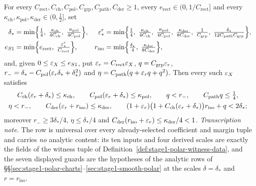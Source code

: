 \begin{lemma}\label{lem:stage1-polar-scalar-arithmetic}
For every $C_{\mathrm{rect}},C_{\mathrm{ch}},C_{\mathrm{pol}},C_{\mathrm{grp}},
C_{\mathrm{path}},C_{\mathrm{der}}\ge1$, every
$e_{\mathrm{rect}}\in(0,1/C_{\mathrm{rect}}]$ and every
$\kappa_{\mathrm{ch}},\kappa_{\mathrm{pol}},\kappa_{\mathrm{der}}\in(0,\tfrac12]$, set
\begin{align}
  \delta_*&=\min\Bigl\{\tfrac14,\;\tfrac{\kappa_{\mathrm{ch}}}{4C_{\mathrm{ch}}},\;
    \tfrac{\kappa_{\mathrm{pol}}}{4C_{\mathrm{pol}}}\Bigr\},
  &
  \varepsilon_*^{r}&=\min\Bigl\{\tfrac14,\;\tfrac{\kappa_{\mathrm{ch}}}{4C_{\mathrm{ch}}},\;
    \tfrac{\kappa_{\mathrm{pol}}}{4C_{\mathrm{pol}}},\;
    \tfrac{\kappa_{\mathrm{der}}}{8C_{\mathrm{der}}},\;
    \tfrac1{C_{\mathrm{grp}}},\;
    \tfrac{\delta_*}{12C_{\mathrm{path}}C_{\mathrm{grp}}}\Bigr\},
  \label{eq:s1sa-scales}\\
  e_{S1}&=\min\Bigl\{e_{\mathrm{rect}},\;\tfrac{\varepsilon_*^{r}}{C_{\mathrm{rect}}}\Bigr\},
  &
  r_{\mathrm{iso}}&=\min\Bigl\{\tfrac{\delta_*}4,\;\tfrac{\kappa_{\mathrm{der}}}{8C_{\mathrm{der}}}\Bigr\},
  \nonumber
\end{align}
and, given $0\le\varepsilon_X\le e_{S1}$, put $\varepsilon_r=C_{\mathrm{rect}}\varepsilon_X$,
$q=C_{\mathrm{grp}}\varepsilon_r$,
$r_-=\delta_*-C_{\mathrm{pol}}(\varepsilon_r\delta_*+\delta_*^{2})$ and
$\eta=C_{\mathrm{path}}(q+\varepsilon_rq+q^{2})$. Then every such $\varepsilon_X$ satisfies
\begin{gather}
  C_{\mathrm{ch}}(\varepsilon_r+\delta_*)\le\kappa_{\mathrm{ch}},\qquad
  C_{\mathrm{pol}}(\varepsilon_r+\delta_*)\le\kappa_{\mathrm{pol}},\qquad
  q<r_-,\qquad
  C_{\mathrm{path}}q\le\tfrac14,
  \label{eq:s1sa-guards1}\\
  \eta<r_-,\qquad
  C_{\mathrm{der}}(\varepsilon_r+r_{\mathrm{iso}})\le\kappa_{\mathrm{der}},\qquad
  (1+\varepsilon_r)\bigl(1+C_{\mathrm{ch}}(\varepsilon_r+\delta_*)\bigr)r_{\mathrm{iso}}+q<2\delta_*;
  \label{eq:s1sa-guards2}
\end{gather}
moreover $r_-\ge3\delta_*/4$, $\eta\le\delta_*/4$ and
$C_{\mathrm{der}}(r_{\mathrm{iso}}+\varepsilon_r)\le\kappa_{\mathrm{der}}/4<1$.
\emph{Transcription note.} The row is universal over every already-selected coefficient
and margin tuple and carries \emph{no} analytic content: its ten inputs and four derived
scales are exactly the fields of the witness tuple of
Definition~\ref{def:stage1-polar-witness-data}, and the seven displayed guards are the
hypotheses of the analytic rows of
\S\S\ref{sec:stage1-polar-charts}--\ref{sec:stage1-smooth-polar} at the scales
$\delta=\delta_*$ and $r=r_{\mathrm{iso}}$.
\end{lemma}

